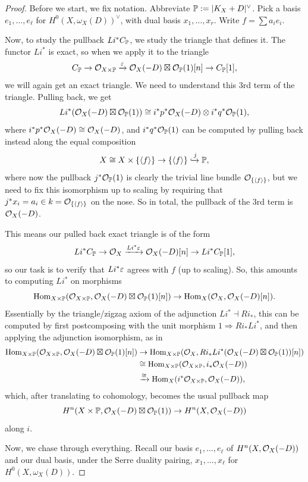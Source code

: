\documentclass[12pt]{article}
\begin{document}
\begin{proof}
    Before we start, we fix notation. Abbreviate $\P\defeq |K_X+D|^\vee$. Pick a basis $e_1,\dots,e_\ell$ for $H^0(X,\omega_X(D))^\vee$, with dual basis $x_1,\dots,x_r$. Write $f=\sum a_i e_i$.
    
    Now, to study the pullback $Li^* C_\P$, we study the triangle that defines it. The functor $Li^*$ is exact, so when we apply it to the triangle
    \[C_{\P} \to \cO_{X\times \P} \xrightarrow{\eps} \cO_X(-D) \boxtimes \cO_{\P}(1)[n] \to C_\P[1],\]
    we will again get an exact triangle. We need to understand this 3rd term of the triangle. Pulling back, we get
    \[Li^*(\cO_X(-D) \boxtimes \cO_{\P}(1)) \cong i^*p^*\cO_X(-D) \otimes i^*q^* \cO_\P(1),\]
    where $i^*p^*\cO_X(-D)\cong \cO_X(-D)$, and $i^*q^* \cO_\P(1)$ can be computed by pulling back instead along the equal composition
    \[X\cong X\times \{\<f\>\} \to \{\<f\>\} \xhookrightarrow{j} \P,\]
    where now the pullback $j^*\cO_\P(1)$ is clearly the trivial line bundle $\cO_{\{\<f\>\}}$, but we need to fix this isomorphism up to scaling by requiring that $j^*x_i = a_i\in k=\cO_{\{\<f\>\}}$ on the nose. So in total, the pullback of the 3rd term is $\cO_X(-D)$.

    This means our pulled back exact triangle is of the form
    \[Li^* C_{\P} \to \cO_X \xrightarrow{Li^* \eps} \cO_X(-D)[n]\to Li^* C_\P[1],\]
    so our task is to verify that $Li^*\eps$ agrees with $f$ (up to scaling). So, this amounts to computing $Li^*$ on morphisms
    \[\Hom_{X\times\P}(\cO_{X\times \P},\cO_X(-D)\boxtimes \cO_\P(1)[n]) \to \Hom_X(\cO_X,\cO_X(-D)[n]).\]
    Essentially by the triangle/zigzag axiom of the adjunction $Li^* \dashv Ri_*$, this can be computed by first postcomposing with the unit morphism $1\Rightarrow Ri_*Li^*$, and then applying the adjunction isomorphism, as in
    \begin{align*}
        \Hom_{X\times\P}(\cO_{X\times \P},\cO_X(-D)\boxtimes \cO_\P(1)[n]) &\to \Hom_{X\times \P}(\cO_X,Ri_*Li^*(\cO_X(-D)\boxtimes \cO_\P(1))[n])\\
        &\cong \Hom_{X\times \P}(\cO_{X\times \P},i_*\cO_X(-D))\\
        &\xrightarrow{\cong} \Hom_{X}(i^*\cO_{X\times \P},\cO_X(-D)),
    \end{align*}
    which, after translating to cohomology, becomes the usual pullback map
    \[H^n(X\times \P, \cO_X(-D)\boxtimes\cO_\P(1)) \to H^n(X,\cO_X(-D))\]
    along $i$.
    
    Now, we chase through everything. Recall our basis $e_1,\dots,e_\ell$ of $H^n(X,\cO_X(-D))$ and our dual basis, under the Serre duality pairing, $x_1,\dots,x_\ell$ for $H^0(X,\omega_X(D))$.


\end{proof}
\end{document}
